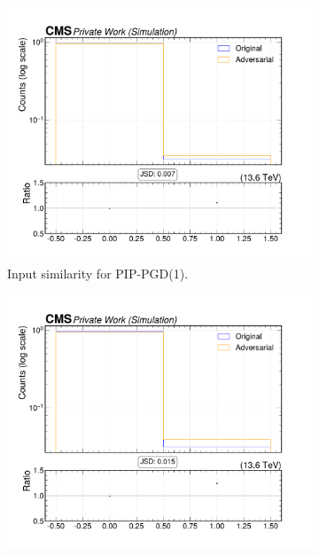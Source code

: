 \begin{figure}[htbp]
  \centering
  \begin{subfigure}[t]{0.32\textwidth}
    \includegraphics[width=\linewidth]{media/output/features/compare/combined_it_1/cmp_npf_arr_Npfcan_HadFrac.pdf}
    \caption*{Input similarity for PIP-PGD(1).}
  \end{subfigure}\hfill
  \begin{subfigure}[t]{0.32\textwidth}
    \includegraphics[width=\linewidth]{media/output/features/compare/combined_it_2/cmp_npf_arr_Npfcan_HadFrac.pdf}

\end{subfigure}
\end{figure}
